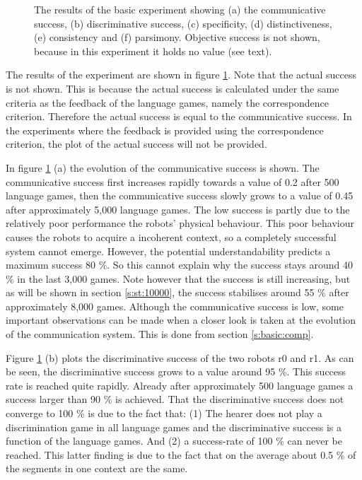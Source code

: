 \begin{figure}
\caption{The results of the basic experiment showing (a) the communicative success, (b) discriminative success, (c) specificity, (d) distinctiveness, (e) consistency and (f) parsimony. Objective success is not shown, because in this experiment it holds no value (see text).}
\label{f:st:plot}
\end{figure}


The results of the experiment are shown in figure \ref{f:st:plot}. Note that the actual success is not shown. This is because the actual success is calculated under the same criteria as the feedback of the language games, namely the correspondence criterion. Therefore the actual success is equal to the communicative success. In the experiments where the feedback is provided using the correspondence criterion, the plot of the actual success will not be provided.

In figure \ref{f:st:plot} (a) the evolution of the communicative success is shown. The communicative success first increases rapidly towards a value of 0.2 after 500 language games, then the communicative success slowly grows to a value of 0.45 after approximately 5,000 language games. The low success is partly due to the relatively poor performance the robots' physical behaviour. This poor behaviour causes the robots to acquire a incoherent context, so a completely successful system cannot emerge. However, the potential understandability predicts a maximum success 80 \%. So this cannot explain why the success stays around 40 \% in the last 3,000 games. Note however that the success is still increasing, but as will be shown in section \ref{s:st:10000}, the success stabilises around 55 \% after approximately 8,000 games. Although the communicative success is low, some important observations can be made when a closer look is taken at the evolution of the communication system. This is done from section \ref{s:basic:comp}.

Figure \ref{f:st:plot} (b) plots the discriminative success of the two robots r0 and r1. As can be seen, the discriminative success grows to a value around 95 \%. This success rate is reached quite rapidly. Already after approximately 500 language games a success larger than 90 \% is achieved. That the discriminative success does not converge to 100 \% is due to the fact that: (1) The hearer does not play a discrimination game in all language games and the discriminative success is a function of the language games. And (2) a success-rate of 100 \% can never be reached. This latter finding is due to the fact that on the average about 0.5 \% of the segments in one context are the same. 

